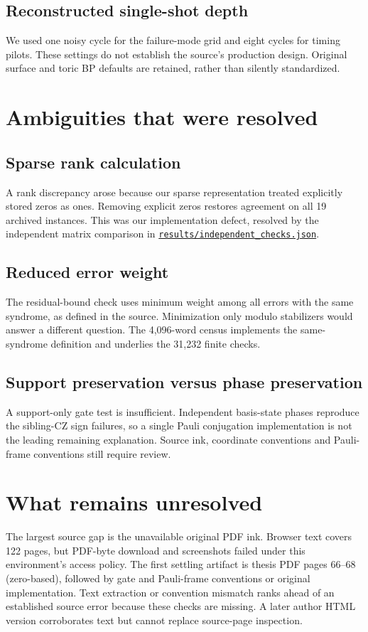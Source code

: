 \documentclass[11pt]{article}
\begin{document}
\subsection{Reconstructed single-shot depth}
We used one noisy cycle for the failure-mode grid and eight cycles for timing pilots. These settings do not establish the source's production design. Original surface and toric BP defaults are retained, rather than silently standardized.

\section{Ambiguities that were resolved}
\subsection{Sparse rank calculation}
A rank discrepancy arose because our sparse representation treated explicitly stored zeros as ones. Removing explicit zeros restores agreement on all 19 archived instances. This was our implementation defect, resolved by the independent matrix comparison in \href{https://github.com/alectionary/vibe-math/blob/master/formalization/quintavalle-hgp/results/independent_checks.json}{\nolinkurl{results/independent_checks.json}}.
\subsection{Reduced error weight}
The residual-bound check uses minimum weight among all errors with the same syndrome, as defined in the source. Minimization only modulo stabilizers would answer a different question. The 4,096-word census implements the same-syndrome definition and underlies the 31,232 finite checks.
\subsection{Support preservation versus phase preservation}
A support-only gate test is insufficient. Independent basis-state phases reproduce the sibling-CZ sign failures, so a single Pauli conjugation implementation is not the leading remaining explanation. Source ink, coordinate conventions and Pauli-frame conventions still require review.

\section{What remains unresolved}
The largest source gap is the unavailable original PDF ink. Browser text covers 122 pages, but PDF-byte download and screenshots failed under this environment's access policy. The first settling artifact is thesis PDF pages 66--68 (zero-based), followed by gate and Pauli-frame conventions or original implementation. Text extraction or convention mismatch ranks ahead of an established source error because these checks are missing. A later author HTML version corroborates text but cannot replace source-page inspection.
\end{document}
